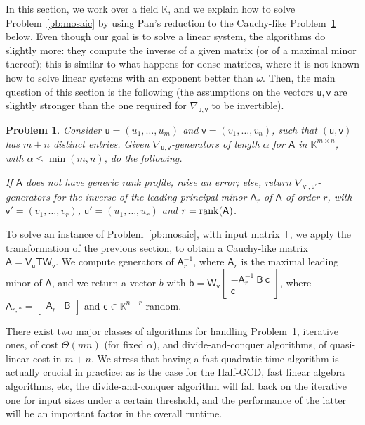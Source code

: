 \documentclass[sigconf]{acmart}
\newcommand{\vb}{\ensuremath{\mathsf{b}}}
\newcommand{\vc}{\ensuremath{\mathsf{c}}}
\newcommand{\vu}{\ensuremath{\mathsf{u}}}
\newcommand{\vv}{\ensuremath{\mathsf{v}}}
\newcommand{\mA}{\ensuremath{\mathsf{A}}}
\newcommand{\mB}{\ensuremath{\mathsf{B}}}
\newcommand{\mT}{\ensuremath{\mathsf{T}}}
\newcommand{\mV}{\ensuremath{\mathsf{V}}}
\newcommand{\mW}{\ensuremath{\mathsf{W}}}
\newcommand{\K}{\ensuremath{\mathbb{K}}}
\newtheorem{pbm}{Problem}
\theoremstyle{acmdefinition}
\begin{document}
In this section, we work over a field $\K$, and we explain how to
solve Problem~\ref{pb:mosaic} by using Pan's reduction to the
Cauchy-like Problem~\ref{pb:cauchy} below. Even though our goal is to
solve a linear system, the algorithms do slightly more: they compute
the inverse of a given matrix (or of a maximal minor thereof); this is
similar to what happens for dense matrices, where it is not known how
to solve linear systems with an exponent better than $\omega$.
Then, the main question of this section is the following (the
assumptions on the vectors $\vu,\vv$ are slightly stronger than the
one required for $\nabla_{\vu,\vv}$ to be invertible). 
%
\begin{pbm}\label{pb:cauchy}
  Consider $\vu=(u_1,\dots,u_m)$ and $\vv=(v_1,\dots,v_n)$,
  such that $(\vu,\vv)$ has $m+n$ distinct entries. Given
  $\nabla_{\vu,\vv}$-generators of length $\alpha$ for $\mA$
  in $\K^{m \times n}$, with $\alpha \le \min(m,n)$, do the following.

  If $\mA$ does not have generic rank profile, raise an error;
  else, return $\nabla_{\vv',\vu'}$-generators for the inverse
    of the leading principal minor $\mA_r$ of $\mA$ of order $r$, with
    $\vv'=(v_1,\dots,v_r)$, $\vu'=(u_1,\dots,u_r)$ and
    $r={\rm rank}(\mA)$.
\end{pbm}
%
To solve an instance of Problem~\ref{pb:mosaic}, with input matrix
$\mT$, we apply the transformation of the previous section, to obtain
a Cauchy-like matrix $\mA = \mV_\vu \mT \mW_{\vv}$. We compute
generators of $\mA_{r}^{-1}$, where $\mA_r$ is the maximal leading minor
of $\mA$, and we return a vector $b$ with
$\vb=\mW_{\vv}
\left[\begin{smallmatrix} 
-\mA_r^{-1} \ \mB \ \vc \\ 
\vc
\end{smallmatrix}\right]$,
where 
%
$\mA_{r,\ast}=\begin{bmatrix}
    \mA_r & \mB
  \end{bmatrix}$ 
and $\vc \in \K^{n-r}$ random.

There exist two major classes of algorithms for handling
Problem~\ref{pb:cauchy}, iterative ones, of cost  $\Theta(mn)$
(for fixed $\alpha$), and  divide-and-conquer
algorithms, of quasi-linear cost in $m+n$. We stress that having a
fast quadratic-time algorithm is actually crucial in practice: as is
the case for the Half-GCD, fast linear algebra algorithms, etc, the
divide-and-conquer  algorithm will fall back on the iterative one for input
sizes under a certain threshold, and the performance of the latter
will be an important factor in the overall runtime.
\end{document}
